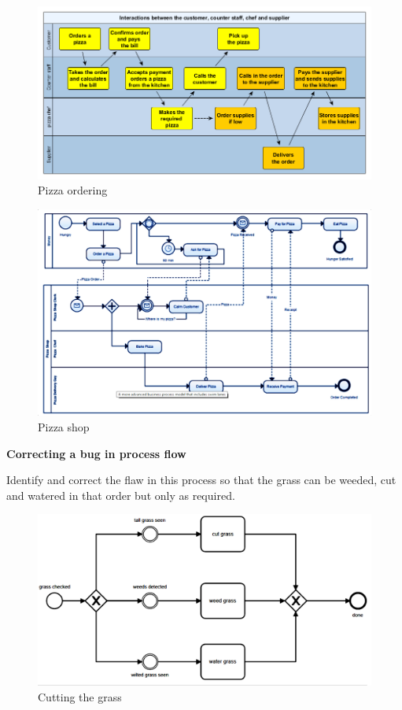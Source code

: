 \documentclass[]{book}
\let\BeginKnitrBlock\begin \let\EndKnitrBlock\end
\begin{document}
\begin{figure}
\centering
\includegraphics{images/pizza.png}
\caption{Pizza ordering}
\end{figure}

\begin{figure}
\centering
\includegraphics{images/pizza2.png}
\caption{Pizza shop}
\end{figure}

\BeginKnitrBlock{rmdexercise}
\textbf{Correcting a bug in process flow}

Identify and correct the flaw in this process so that
the grass can be weeded, cut and watered in that order but only as required.
\EndKnitrBlock{rmdexercise}

\begin{figure}
\centering
\includegraphics{images/cutgrass.png}
\caption{Cutting the grass}
\end{figure}
\end{document}
